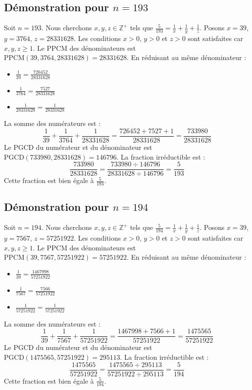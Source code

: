 \documentclass[11pt,a4paper]{article}
\begin{document}
\subsection{Démonstration pour $n = 193$}
Soit $n = 193$. Nous cherchons $x, y, z \in \mathbb{Z}^{+}$ tels que $\frac{5}{193} = \frac{1}{x} + \frac{1}{y} + \frac{1}{z}$.
Posons $x = 39$, $y = 3764$, $z = 28331628$.
Les conditions $x > 0$, $y > 0$ et $z > 0$ sont satisfaites car $x, y, z \geq 1$.
Le PPCM des dénominateurs est $\text{PPCM}(39, 3764, 28331628) = 28331628$.
En réduisant au même dénominateur :
\begin{itemize}
    \item $\frac{1}{39} = \frac{726452}{28331628}$
    \item $\frac{1}{3764} = \frac{7527}{28331628}$
    \item $\frac{1}{28331628} = \frac{1}{28331628}$
\end{itemize}
La somme des numérateurs est :
$$ \frac{1}{39} + \frac{1}{3764} + \frac{1}{28331628} = \frac{726452 + 7527 + 1}{28331628} = \frac{733980}{28331628} $$
Le PGCD du numérateur et du dénominateur est $\text{PGCD}(733980, 28331628) = 146796$.
La fraction irréductible est :
$$ \frac{733980}{28331628} = \frac{733980 \div 146796}{28331628 \div 146796} = \frac{5}{193} $$
Cette fraction est bien égale à $\frac{5}{193}$.

\subsection{Démonstration pour $n = 194$}
Soit $n = 194$. Nous cherchons $x, y, z \in \mathbb{Z}^{+}$ tels que $\frac{5}{194} = \frac{1}{x} + \frac{1}{y} + \frac{1}{z}$.
Posons $x = 39$, $y = 7567$, $z = 57251922$.
Les conditions $x > 0$, $y > 0$ et $z > 0$ sont satisfaites car $x, y, z \geq 1$.
Le PPCM des dénominateurs est $\text{PPCM}(39, 7567, 57251922) = 57251922$.
En réduisant au même dénominateur :
\begin{itemize}
    \item $\frac{1}{39} = \frac{1467998}{57251922}$
    \item $\frac{1}{7567} = \frac{7566}{57251922}$
    \item $\frac{1}{57251922} = \frac{1}{57251922}$
\end{itemize}
La somme des numérateurs est :
$$ \frac{1}{39} + \frac{1}{7567} + \frac{1}{57251922} = \frac{1467998 + 7566 + 1}{57251922} = \frac{1475565}{57251922} $$
Le PGCD du numérateur et du dénominateur est $\text{PGCD}(1475565, 57251922) = 295113$.
La fraction irréductible est :
$$ \frac{1475565}{57251922} = \frac{1475565 \div 295113}{57251922 \div 295113} = \frac{5}{194} $$
Cette fraction est bien égale à $\frac{5}{194}$.
\end{document}

